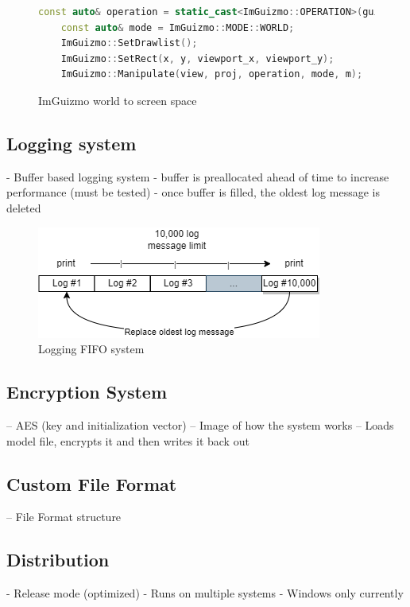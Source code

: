 \documentclass[11pt]{article}
\begin{document}
\begin{figure}[ht]
  \centering
  \begin{lstlisting}[language=C++]
    const auto& operation = static_cast<ImGuizmo::OPERATION>(guizmo_operation);
    const auto& mode = ImGuizmo::MODE::WORLD;
    ImGuizmo::SetDrawlist();
    ImGuizmo::SetRect(x, y, viewport_x, viewport_y);
    ImGuizmo::Manipulate(view, proj, operation, mode, m);
  \end{lstlisting}
  \caption{ImGuizmo world to screen space}
  \label{fig:imguizmo_code}
\end{figure}



\subsection{Logging system}
- Buffer based logging system
- buffer is preallocated ahead of time to increase performance (must be tested)
- once buffer is filled, the oldest log message is deleted

\begin{figure}[h!]
  \centering
  \includegraphics[width=\textwidth]{images/logging.png}
  \caption{Logging FIFO system}
  \label{fig:logging_system}
\end{figure}

\subsection{Encryption System}
-- AES (key and initialization vector)
-- Image of how the system works 
  -- Loads model file, encrypts it and then writes it back out


\subsection{Custom File Format}
-- File Format structure



\subsection{Distribution}
- Release mode (optimized)
- Runs on multiple systems
- Windows only currently
\end{document}
